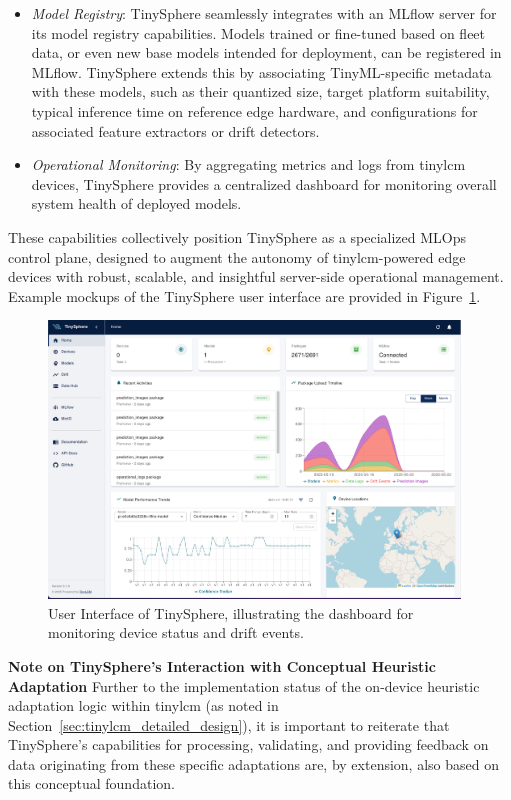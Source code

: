 \begin{itemize}
    \item \textit{Model Registry}: TinySphere seamlessly integrates with an MLflow server for its model registry capabilities. Models trained or fine-tuned based on fleet data, or even new base models intended for deployment, can be registered in MLflow. TinySphere extends this by associating TinyML-specific metadata with these models, such as their quantized size, target platform suitability, typical inference time on reference edge hardware, and configurations for associated feature extractors or drift detectors.
    \item \textit{Operational Monitoring}: By aggregating metrics and logs from \gls{tinylcm} devices, TinySphere provides a centralized dashboard for monitoring overall system health of deployed models.
\end{itemize}
These capabilities collectively position TinySphere as a specialized MLOps control plane, designed to augment the autonomy of \gls{tinylcm}-powered edge devices with robust, scalable, and insightful server-side operational management. Example mockups of the TinySphere user interface are provided in Figure~\ref{fig:uitinysphere}.

\begin{figure}[htbp]
    \centering
    \includegraphics[width=0.975\textwidth]{figs/framework/ui-tinyssphere.png}
    \caption[User Interface of TinySphere]{User Interface of TinySphere, illustrating the dashboard for monitoring device status and drift events.}
    \label{fig:uitinysphere}
\end{figure}

\begin{MyBox}{\textbf{Note on TinySphere's Interaction with Conceptual Heuristic Adaptation}}
    Further to the implementation status of the on-device heuristic adaptation logic within \gls{tinylcm} (as noted in Section~\ref{sec:tinylcm_detailed_design}), it is important to reiterate that TinySphere's capabilities for processing, validating, and providing feedback on data originating from these specific adaptations are, by extension, also based on this conceptual foundation.
\end{MyBox}

